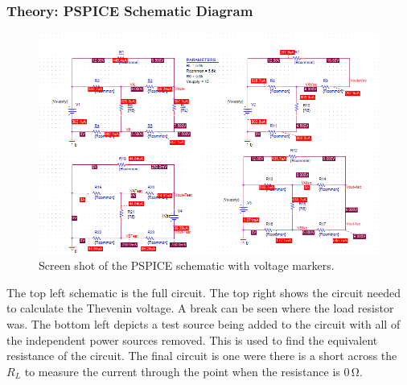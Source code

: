 \documentclass[11pt]{article}
\begin{document}
\subsubsection{Theory: PSPICE Schematic Diagram}

\begin{figure}[h!]
	\begin{center}
		\includegraphics[width=\textwidth]{schematic_1}
		\caption{Screen shot of the PSPICE schematic with voltage markers.}
		\label{Fig:SchematicVoltMarkers}
	\end{center}
\end{figure} 


The top left schematic is the full circuit. The top right shows the circuit needed to calculate the Thevenin voltage. A break can be seen where the load resistor was. The bottom left depicts a test source being added to the circuit with all of the independent power sources removed. This is used to find the equivalent resistance of the circuit. The final circuit is one were there is a short across the $R_L$ to measure the current through the point when the resistance is $0\,\si\ohm$.
\end{document}
